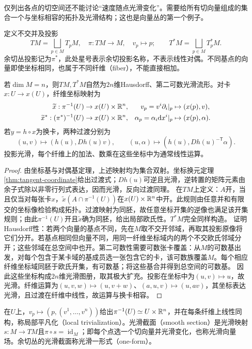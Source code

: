 仅列出各点的切空间还不能讨论“速度随点光滑变化”。需要给所有切向量组成的集合一个与坐标相容的拓扑及光滑结构；这也是向量丛的第一个例子。
\begin{definition}[切丛与余切丛的集合]
定义不交并及投影
\[
 TM=\bigsqcup_{p\in M}T_pM,\quad \pi:TM\to M,\quad v_p\mapsto p;
 \qquad T^*M=\bigsqcup_{p\in M}T_p^*M.
\]
余切丛投影记为$\pi^*$，此处星号表示余切投影名称，不表示线性对偶。不同基点的向量即使坐标相同，也属于不同纤维（fiber），不能直接相加。
\end{definition}
\begin{theorem}[切丛与余切丛的光滑构造]\label{thm:tangent-bundle}
若$\dim M=n$，则$TM,T^*M$自然为$2n$维Hausdorff、第二可数光滑流形。对卡$x:U\to x(U)$，纤维坐标映射为
\begin{align*}
 \widetilde x:\pi^{-1}(U)&\to x(U)\times\mathbb{R}^n,
 &v_p=v^i\partial_i|_p&\mapsto(x(p),v),\\
 \widetilde x^*:(\pi^*)^{-1}(U)&\to x(U)\times\mathbb{R}^n,
 &\alpha_p=\alpha_i\mathrm{d} x^i|_p&\mapsto(x(p),\alpha).
\end{align*}
若$y=h\circ x$为换卡，两种过渡分别为
\[
 (u,v)\mapsto(h(u),Dh(u)v),\qquad
 (u,\alpha)\mapsto(h(u),Dh(u)^{-\mathsf T}\alpha).
\]
投影光滑，每个纤维上的加法、数乘在这些坐标中为通常线性运算。
\end{theorem}
\begin{proof}
由坐标基与对偶基定理，上述映射均为集合双射。坐标换元定理\ref{thm:tangent-coordinate}给出过渡式；$Dh(u)$可逆且光滑，逆转置的矩阵元素由余子式除以非零行列式表达，因而光滑，反向过渡同理。
在$TM$上定义：$A$开，当且仅当对每张卡$x$，$\widetilde x(A\cap\pi^{-1}(U))$在$x(U)\times\mathbb{R}^n$中开。此规则由任意并和有限交的坐标像检验构成拓扑。过渡映射为同胚，故任意坐标开集的逆像也满足该开集规则；由此$\pi^{-1}(U)$开且$\widetilde x$确为同胚，给出局部欧氏性。$T^*M$完全同样构造。
证明Hausdorff性：若两个向量的基点不同，先在$M$取不交开邻域，再取其投影原像将它们分开。若基点相同但向量不同，用同一纤维坐标域内的两个不交欧氏邻域分开；这些邻域在总空间中也开。第二可数性需要可数张卡覆盖：从$M$的可数基出发，对每个包含于某卡域的基成员选一张包含它的卡，该可数族覆盖$M$。每个相应纤维坐标域同胚于欧氏开集，有可数基；将这些基合并得到总空间的可数基。
因此这些坐标构成$2n$维光滑图册，取其极大扩充。投影在坐标中为$(u,v)\mapsto u$，故光滑。纤维运算为$(u,v,w)\mapsto(u,v+w)$、$(a,u,v)\mapsto(u,av)$，其坐标表达光滑，且过渡在纤维中线性，故运算与换卡相容。
\end{proof}
\begin{definition}[局部平凡化与光滑截面]
在$U$上，$v_p\mapsto(p,(v^1,\ldots,v^n))$给出$\pi^{-1}(U)\simeq U\times\mathbb{R}^n$，并在每条纤维上线性同构，称局部平凡化（local trivialization）。光滑截面（smooth section）是光滑映射$s:M\to TM$且$\pi\circ s=\operatorname{id}_M$；即每个点选一个切向量并光滑变化，也称光滑向量场。余切丛的光滑截面称光滑一形式（one-form）。
\end{definition}
